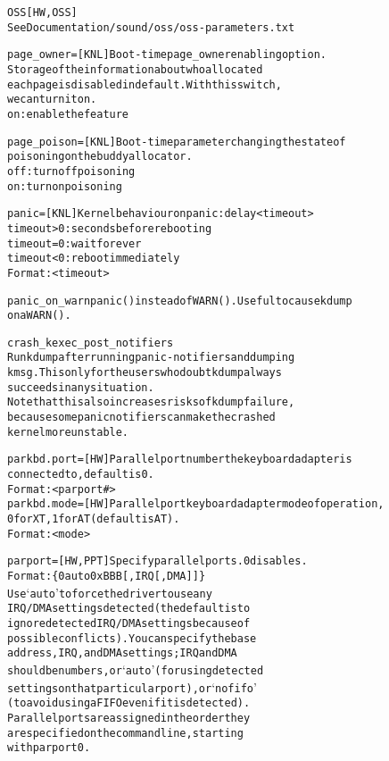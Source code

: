 \documentclass[a4paper,8pt,english]{sphinxmanual}
\begin{document}
\begin{alltt}
        OSS             {[}HW,OSS{]}
                        See Documentation/sound/oss/oss-parameters.txt

        page\_owner=     {[}KNL{]} Boot-time page\_owner enabling option.
                        Storage of the information about who allocated
                        each page is disabled in default. With this switch,
                        we can turn it on.
                        on: enable the feature

        page\_poison=    {[}KNL{]} Boot-time parameter changing the state of
                        poisoning on the buddy allocator.
                        off: turn off poisoning
                        on: turn on poisoning

        panic=          {[}KNL{]} Kernel behaviour on panic: delay \textless{}timeout\textgreater{}
                        timeout \textgreater{} 0: seconds before rebooting
                        timeout = 0: wait forever
                        timeout \textless{} 0: reboot immediately
                        Format: \textless{}timeout\textgreater{}

        panic\_on\_warn   panic() instead of WARN().  Useful to cause kdump
                        on a WARN().

        crash\_kexec\_post\_notifiers
                        Run kdump after running panic-notifiers and dumping
                        kmsg. This only for the users who doubt kdump always
                        succeeds in any situation.
                        Note that this also increases risks of kdump failure,
                        because some panic notifiers can make the crashed
                        kernel more unstable.

        parkbd.port=    {[}HW{]} Parallel port number the keyboard adapter is
                        connected to, default is 0.
                        Format: \textless{}parport\#\textgreater{}
        parkbd.mode=    {[}HW{]} Parallel port keyboard adapter mode of operation,
                        0 for XT, 1 for AT (default is AT).
                        Format: \textless{}mode\textgreater{}

        parport=        {[}HW,PPT{]} Specify parallel ports. 0 disables.
                        Format: \{ 0 \textbar{} auto \textbar{} 0xBBB{[},IRQ{[},DMA{]}{]} \}
                        Use `auto' to force the driver to use any
                        IRQ/DMA settings detected (the default is to
                        ignore detected IRQ/DMA settings because of
                        possible conflicts). You can specify the base
                        address, IRQ, and DMA settings; IRQ and DMA
                        should be numbers, or `auto' (for using detected
                        settings on that particular port), or `nofifo'
                        (to avoid using a FIFO even if it is detected).
                        Parallel ports are assigned in the order they
                        are specified on the command line, starting
                        with parport0.


\end{alltt}
\end{document}
